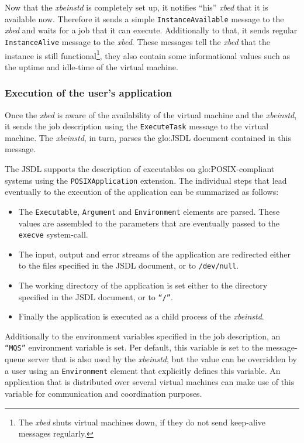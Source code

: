 Now that  the \emph{xbeinstd}  is completely set  up, it  notifies ``his''
\emph{xbed}  that  it  is  available  now. Therefore  it  sends  a  simple
\texttt{InstanceAvailable} message to the  \emph{xbed} and waits for a job
that   it  can   execute.   Additionally   to  that,   it   sends  regular
\texttt{InstanceAlive} message to the \emph{xbed}. These messages tell the
\emph{xbed} that the instance is still functional\footnote{The \emph{xbed}
  shuts virtual  machines down,  if they do  not send  keep-alive messages
  regularly.},  they also contain  some informational  values such  as the
uptime and idle-time of the virtual machine.

\subsubsection{Execution of the user's application}

Once the \emph{xbed}  is aware of the availability  of the virtual machine
and  the   \emph{xbeinstd},  it  sends  the  job   description  using  the
\texttt{ExecuteTask} message to  the virtual machine. The \emph{xbeinstd},
in turn, parses the \gls{glo:JSDL} document contained in this message.

The    JSDL     supports    the    description     of    executables    on
\gls{glo:POSIX}-compliant  systems  using the  \texttt{POSIX\-Application}
extension. The individual  steps that lead eventually to  the execution of
the application can be summarized as follows:

\begin{itemize}
\item The  \texttt{Executable}, \texttt{Argument} and \texttt{Environment}
  elements are parsed.  These values are assembled to  the parameters that
  are eventually passed to the \texttt{execve} system-call.
\item  The  input,  output  and  error  streams  of  the  application  are
  redirected  either to the  files specified  in the  JSDL document,  or to
  \texttt{/dev/null}.
\item  The working  directory  of the  application  is set  either to  the
  directory specified in the JSDL document, or to \texttt{``/''}.
\item  Finally the  application  is executed  as  a child  process of  the
  \emph{xbeinstd}.
\end{itemize}

Additionally   to  the   environment  variables   specified  in   the  job
description,  an  \texttt{``MQS''}   environment  variable  is  set.   Per
default, this  variable is  set to the  message-queue server that  is also
used by  the \emph{xbeinstd}, but the  value can be overridden  by a user
using  an  \texttt{Environment}   element  that  explicitly  defines  this
variable.   An  application  that  is  distributed  over  several  virtual
machines can make use of  this variable for communication and coordination
purposes.


